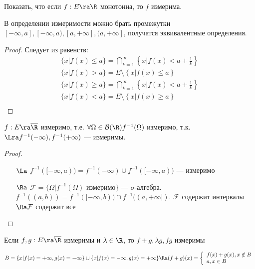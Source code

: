 \begin{problem}
    Показать, что если \(f: E \ra \R\) монотонна, то \(f\) измерима.
\end{problem}

\begin{note}
    В определении измеримости можно брать промежутки \([-\infty, a], [-\infty, a), [a, +\infty], (a, +\infty]\), получатся эквивалентные определения.
\end{note}
\begin{proof}
    Следует из равенств:
    \[\begin{array}{c}
        \{x | f(x) \le a\} = \bigcap_{k = 1}^\infty \left\{x | f(x) < a + \frac{1}{k}\right\} \\
        \{x | f(x) > a\} = E \setminus \left\{x | f(x) \le a\right\} \\
        \{x | f(x) \ge a\} = \bigcap_{k = 1}^\infty \left\{x | f(x) < a + \frac{1}{k}\right\} \\
        \{x | f(x) < a\} = E \setminus \left\{x | f(x) \ge a\right\} \\
    \end{array}\]
\end{proof}

\begin{lemma}
    \(f: E \ra \overline{\R}\) измеримо, т.е. \(\forall \Omega \in \mathcal{B}(\R) f^{-1}(\Omega)\) измеримо, т.к. \(\Lra f^{-1}(-\infty), f^{-1}(+\infty)\) --- измеримы.
\end{lemma}
\begin{proof}\indent
    \begin{enumerate}
        \item[\(\La\)] \(f^{-1}([-\infty, a)) = f^{-1}(-\infty) \cup f^{-1}([-\infty, a))\) --- измеримо
        \item[\(\Ra\)] \(\mathcal{F} = \{\Omega | f^{-1}(\Omega)\text{ измеримо}\}\) --- \(\sigma\)-алгебра. \(f^{-1}((a, b)) = f^{-1}([-\infty, b)) \cap f^{-1}((a, +\infty])\). \(\mathcal{F}\) содержит интервалы \(\Ra \mathcal{F}\) содержит все 
    \end{enumerate}    
\end{proof}

\begin{theorem}
    Если \(f, g: E \ra \overline{\R}\) измеримы и \(\lambda \in \R\), то \(f + g, \lambda g, fg\) измеримы
\end{theorem}

\begin{note}
    \(B = \{x | f(x) = +\infty, g(x) = -\infty\} \cup \{x | f(x) = -\infty, g(x) = +\infty\} \Ra (f + g)(x) = \left\{\begin{array}{l}
        f(x) + g(x), x \notin B \\
        a, x \in B
    \end{array}\right.\)
\end{note}